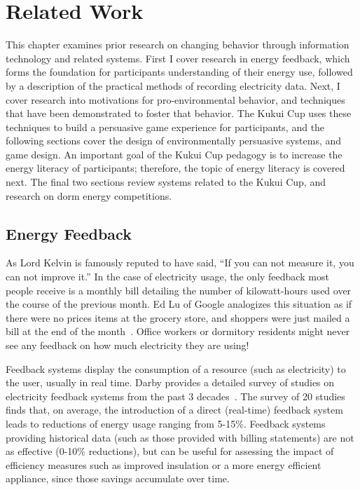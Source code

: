 \chapter{Related Work}
\label{cha:related-work}

This chapter examines prior research on changing behavior through information technology and related systems. First I cover research in energy feedback, which forms the foundation for participants understanding of their energy use, followed by a description of the practical methods of recording electricity data. Next, I cover research into motivations for pro-environmental behavior, and techniques that have been demonstrated to foster that behavior. The Kukui Cup uses these techniques to build a persuasive game experience for participants, and the following sections cover the design of environmentally persuasive systems, and game design. An important goal of the Kukui Cup pedagogy is to increase the energy literacy of participants; therefore, the topic of energy literacy is covered next. The final two sections review systems related to the Kukui Cup, and research on dorm energy competitions.


\section{Energy Feedback}
\label{sec:energy-feedback}

As Lord Kelvin is famously reputed to have said, ``If you can not measure it, you can not improve it.'' In the case of electricity usage, the only feedback most people receive is a monthly bill detailing the number of kilowatt-hours used over the course of the previous month. Ed Lu of Google analogizes this situation as if there were no prices items at the grocery store, and shoppers were just mailed a bill at the end of the month~\cite{Helft2008Googles-Energy}. Office workers or dormitory residents might never see any feedback on how much electricity they are using!

Feedback systems display the consumption of a resource (such as electricity) to the user, usually in real time. Darby provides a detailed survey of studies on electricity feedback systems from the past 3 decades~\cite{darby-review-2006}. The survey of 20 studies finds that, on average, the introduction of a direct (real-time) feedback system leads to reductions of energy usage ranging from 5-15\%. Feedback systems providing historical data (such as those provided with billing statements) are not as effective (0-10\% reductions), but can be useful for assessing the impact of efficiency measures such as improved insulation or a more energy efficient appliance, since those savings accumulate over time.

